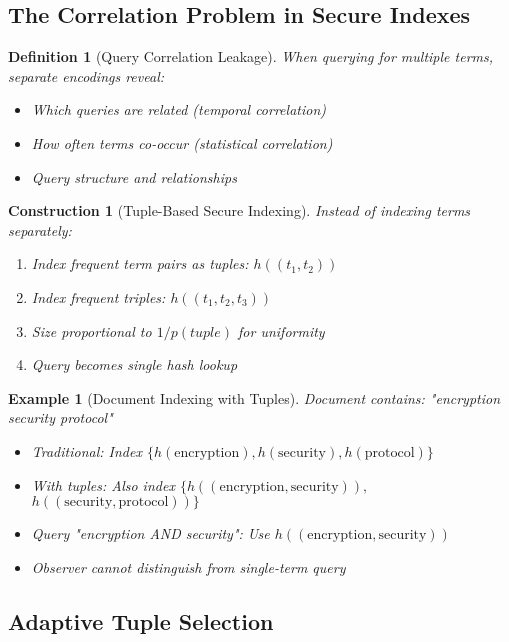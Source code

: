 \documentclass[11pt,final,hidelinks]{article}
\newtheorem{definition}[theorem]{Definition}
\newtheorem{example}[theorem]{Example}
\newtheorem{construction}[theorem]{Construction}
\begin{document}
\subsection{The Correlation Problem in Secure Indexes}

\begin{definition}[Query Correlation Leakage]
When querying for multiple terms, separate encodings reveal:
\begin{itemize}
    \item Which queries are related (temporal correlation)
    \item How often terms co-occur (statistical correlation)
    \item Query structure and relationships
\end{itemize}
\end{definition}

\begin{construction}[Tuple-Based Secure Indexing]
Instead of indexing terms separately:
\begin{enumerate}
    \item Index frequent term pairs as tuples: $h((t_1, t_2))$
    \item Index frequent triples: $h((t_1, t_2, t_3))$
    \item Size proportional to $1/p(tuple)$ for uniformity
    \item Query becomes single hash lookup
\end{enumerate}
\end{construction}

\begin{example}[Document Indexing with Tuples]
Document contains: "encryption security protocol"
\begin{itemize}
    \item Traditional: Index $\{h(\text{encryption}), h(\text{security}), h(\text{protocol})\}$
    \item With tuples: Also index $\{h((\text{encryption}, \text{security})),$ $h((\text{security}, \text{protocol}))\}$
    \item Query "encryption AND security": Use $h((\text{encryption}, \text{security}))$
    \item Observer cannot distinguish from single-term query
\end{itemize}
\end{example}

\subsection{Adaptive Tuple Selection}
\end{document}
